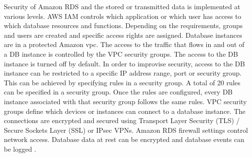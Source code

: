 \par Security of Amazon RDS and the stored or transmitted data is implemented at various levels.
AWS IAM controls which application or which user has access to which database resources and functions.
Depending on the requirements, groups and users are created and specific access rights are assigned.
Database instances are in a protected Amazon \gls{vpc}.
The access to the traffic that flows in and out of a DB instance is controlled by the VPC security groups.
The access to the DB instance is turned off by default.
In order to improvise security, access to the DB instance can be restricted to a specific IP address range, port or security group.
This can be achieved by specifying rules in a security group.
A total of 20 rules can be specified in a security group.
Once the rules are configured, every DB instance associated with that security group follows the same rules.
VPC security groups define which devices or instances can connect to a database instance.
The connections are encrypted and secured using Transport Layer Security (TLS) / Secure Sockets Layer (SSL) or IPsec VPNs. Amazon RDS firewall settings control network access. Database data at rest can be encrypted and database events can be logged \cite{71}.

